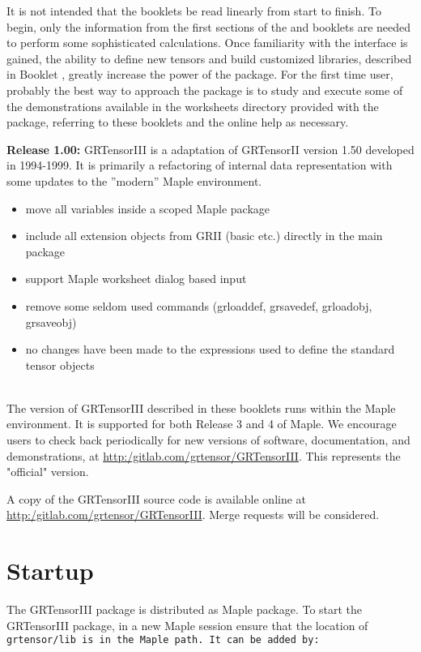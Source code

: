 \documentclass{article}
\begin{document}
It is not intended that the booklets be read linearly from start to
finish. To begin, only the information from the first sections of the
\textsl{\grMakegTitle} and \textsl{\grCalcTitle} booklets are needed
to perform some sophisticated calculations. Once familiarity with the
interface is gained, the ability to define new tensors and build
customized libraries, described in Booklet \grDefRef, greatly increase
the power of the package.  For the first time user, probably the best
way to approach the package is to study and execute some of the
demonstrations available in the worksheets directory provided with 
the package, referring to these booklets and the online help as
necessary.

\textbf{Release 1.00:} GRTensorIII is a adaptation of GRTensorII
version 1.50 developed in 1994-1999. It is primarily a refactoring
of internal data representation with some updates to the ''modern''
Maple environment. \\
\begin{itemize}
  \item move all variables inside a scoped Maple package
  \item include all extension objects from GRII (basic etc.) directly
  in the main package
  \item support Maple worksheet dialog based input
  \item remove some seldom used commands (grloaddef, grsavedef, 
  grloadobj, grsaveobj)
  \item no changes have been made to the expressions used to define
  the standard tensor objects
\end{itemize}\\

The version of GRTensorIII described in these booklets runs within the
Maple environment.  It is supported for both Release 3 and 4 of
Maple. 
We encourage users to check back periodically for new
versions of software, documentation, and demonstrations, at \href{url}{http:/gitlab.com/grtensor/GRTensorIII}.
This represents the "official" version. 

A copy of the GRTensorIII source code is available online at 
\href{url}{http:/gitlab.com/grtensor/GRTensorIII}. Merge requests
will be considered. 

%
\section{Startup}
The GRTensorIII package is distributed as Maple package. 
To start the GRTensorIII package, in a new Maple session ensure
that the location of \text\tt{grtensor/lib} is in the Maple path. It can be added
by:\\
\end{document}
